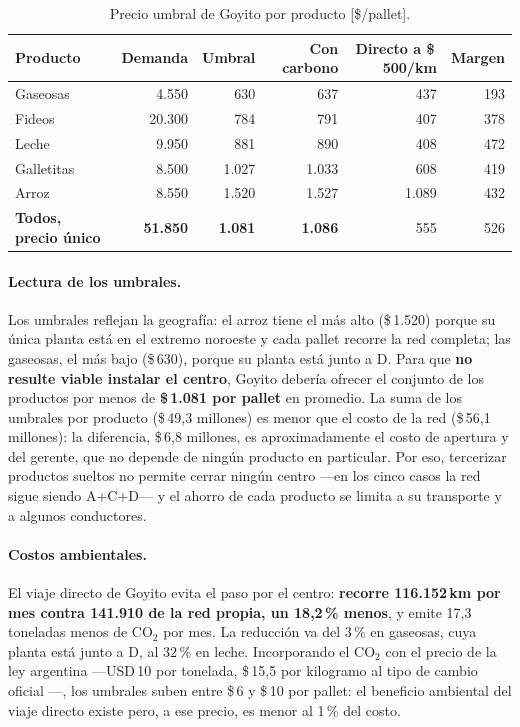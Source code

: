 \documentclass[10pt,a4paper]{article}
\begin{document}
\begin{table}[H]
\centering\small
\caption{Precio umbral de Goyito por producto [\$/pallet].}
\label{tab:goyito}
\begin{tabular}{lrrrrr}
\toprule
\textbf{Producto} & \textbf{Demanda} & \textbf{Umbral} & \textbf{Con carbono} & \textbf{Directo a \$\,500/km} & \textbf{Margen} \\
\midrule
Gaseosas   & 4.550  & 630   & 637   & 437   & 193 \\
Fideos     & 20.300 & 784   & 791   & 407   & 378 \\
Leche      & 9.950  & 881   & 890   & 408   & 472 \\
Galletitas & 8.500  & 1.027 & 1.033 & 608   & 419 \\
Arroz      & 8.550  & 1.520 & 1.527 & 1.089 & 432 \\
\midrule
\textbf{Todos, precio único} & \textbf{51.850} & \textbf{1.081} & \textbf{1.086} & 555 & 526 \\
\bottomrule
\end{tabular}
\end{table}

\paragraph{Lectura de los umbrales.} Los umbrales reflejan la geografía: el
arroz tiene el más alto (\$\,1.520) porque su única planta está en el extremo
noroeste y cada pallet recorre la red completa; las gaseosas, el más bajo
(\$\,630), porque su planta está junto a D. Para que \textbf{no resulte viable
instalar el centro}, Goyito debería ofrecer el conjunto de los productos por
menos de \textbf{\$\,1.081 por pallet} en promedio. La suma de los umbrales por
producto (\$\,49,3 millones) es menor que el costo de la red (\$\,56,1
millones): la diferencia, \$\,6,8 millones, es aproximadamente el costo de
apertura y del gerente, que no depende de ningún producto en particular. Por
eso, tercerizar productos sueltos no permite cerrar ningún centro —en los cinco
casos la red sigue siendo A+C+D— y el ahorro de cada producto se limita a su
transporte y a algunos conductores.

\paragraph{Costos ambientales.} El viaje directo de Goyito evita el paso por el
centro: \textbf{recorre 116.152\,km por mes contra 141.910 de la red propia, un
18,2\,\% menos}, y emite 17,3 toneladas menos de CO$_2$ por mes. La reducción
va del 3\,\% en gaseosas, cuya planta está junto a D, al 32\,\% en leche.
Incorporando el CO$_2$ con el precio de la ley argentina
\cite{ley27430} —USD\,10 por tonelada, \$\,15,5 por kilogramo al tipo de
cambio oficial \cite{bna}—, los umbrales suben entre \$\,6 y \$\,10 por pallet:
el beneficio ambiental del viaje directo existe pero, a ese precio, es menor
al 1\,\% del costo.
\end{document}
